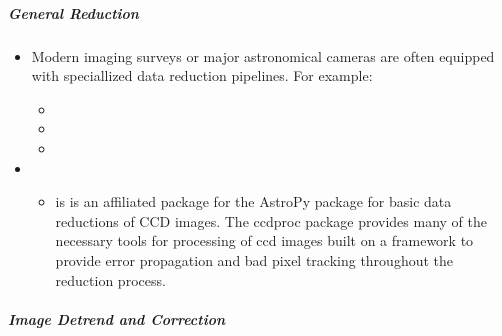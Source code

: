 \documentclass[letterpaper,10pt,english]{sphinxmanual}
\begin{document}
\subparagraph{General Reduction}
\label{\detokenize{resource/astro/topics/ccd_reduction:general-reduction}}\begin{itemize}
\item {} 
Modern imaging surveys or major astronomical cameras are often
equipped with speciallized data reduction pipelines. For example:
\begin{itemize}
\item {} 

\item {} 

\item {} 

\end{itemize}

\item {} 
\begin{itemize}
\item {} 
 is is an affiliated package for the AstroPy package
for basic data reductions of CCD images. The ccdproc package
provides many of the necessary tools for processing of ccd images
built on a framework to provide error propagation and bad pixel
tracking throughout the reduction process. 

\end{itemize}

\end{itemize}


\subparagraph{Image Detrend and Correction}
\label{\detokenize{resource/astro/topics/ccd_reduction:image-detrend-and-correction}}
\end{document}
